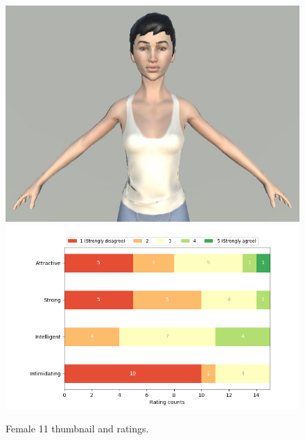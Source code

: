 \begin{figure}[H]
  \includegraphics[width=\linewidth]{Images/Females/11.JPG}
\endminipage\hfill
{}
  \includegraphics[width=\linewidth]{Survey/FRatings/avatar_f11.png}
\endminipage\hfill
\caption{Female 11 thumbnail and ratings.}
\end{figure}


